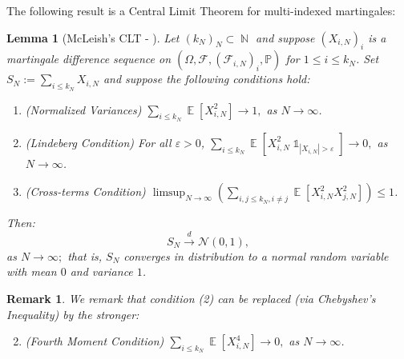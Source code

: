 \documentclass[11pts]{amsart}
\numberwithin{equation}{section}
\newtheorem{lem}{Lemma}[section]
\newtheorem{rem}{Remark}[section]
\DeclareMathOperator{\E}{\mathbb{E}}
\DeclareMathOperator{\N}{\mathbb{N}}
\DeclareMathOperator{\one}{\mathds{1}}
\begin{document}
The following result is a Central Limit Theorem for multi-indexed martingales:

\begin{lem}[McLeish's CLT - {\cite[{Corrolary 2.13}]{McLeish}}]
\label{McLeish_CLT}
Let $(k_N)_N\subset \N$ and suppose $(X_{i,N})_i$ is a \textit{martingale difference sequence} on $(\Omega,\mathcal{F},(\mathcal{F}_{i,N})_i,\mathbb{P})$ for $1\leq i\leq k_N$. Set $S_N:=\sum_{i\leq k_N}X_{i,N}$ and suppose the following conditions hold:
\begin{enumerate}
    \item (Normalized Variances) $\sum_{i\leq k_N}\E\left[X_{i,N}^2\right]\rightarrow 1,$ as $N\rightarrow \infty$.
    \item (Lindeberg Condition) For all $\varepsilon>0$, $\sum_{i\leq k_N}\E\left[X_{i,N}^2\one_{|X_{i,N}|>\varepsilon}\right]\rightarrow 0,$ as $N\rightarrow \infty$.
    \item (Cross-terms Condition) $\limsup_{N\rightarrow \infty} \left(\sum_{i,j\leq k_N, i\neq j}\E\left[X_{i,N}^2X_{j,N}^2\right]\right)\leq 1$.
\end{enumerate}
Then: 
$$S_N\xrightarrow{d}\mathcal{N}(0,1),$$
as $N\rightarrow\infty;$ that is, $S_N$ converges in distribution to a normal random variable with mean $0$ and variance $1$.

\end{lem}

\begin{rem}
\label{fourth_moment_condition}
    We remark that condition (2) can be replaced (via Chebyshev's Inequality) by the stronger: 
    \begin{enumerate}
      \setcounter{enumi}{1}
        \item (Fourth Moment Condition) $\sum_{i\leq k_N}\E\left[X_{i,N}^4\right]\rightarrow 0,$ as $N\rightarrow \infty$.
    \end{enumerate}
\end{rem}
\end{document}
